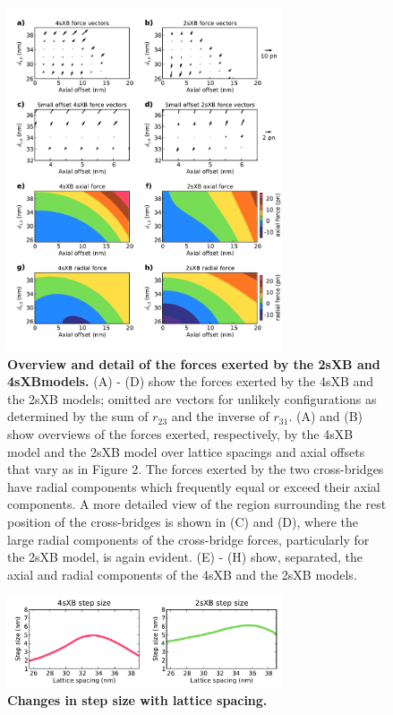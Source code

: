 \documentclass[]{article}
\begin{document}
\begin{figure}[ht]
    \begin{center}
    \includegraphics[width=3.2in]{../imgs/Figure4.pdf}
    \caption{
        \label{fig_forces}
        \textbf{Overview and detail of the forces exerted by the 2sXB and 4sXB\@ models.}
        (A) - (D) show the forces exerted by the 4sXB and the 2sXB models; omitted are vectors for unlikely configurations as determined by the sum of $r_{23}$ and the inverse of $r_{31}$. 
        (A) and (B) show overviews of the forces exerted, respectively, by the 4sXB model and the 2sXB model over lattice spacings and axial offsets that vary as in Figure 2. 
        The forces exerted by the two cross-bridges have radial components which frequently equal or exceed their axial components. 
        A more detailed view of the region surrounding the rest position of the cross-bridges is shown in (C) and (D), where the large radial components of the cross-bridge forces, particularly for the 2sXB model, is again evident.  (E) - (H) show, separated, the axial and radial components of the 4sXB and the 2sXB models.
    }
    \end{center}
\end{figure}

\begin{figure}[ht]
    \begin{center}
    \includegraphics[width=3.2in]{../imgs/FigureS1.pdf}
    \caption{
        \label{fig_step_size}
        \textbf{Changes in step size with lattice spacing.}
    }
    \end{center}
\end{figure}

\clearpage


\end{document}
